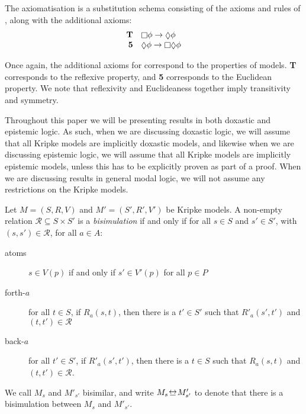 
\begin{definition}
The axiomatisation \axiomS{} is a substitution schema consisting of the axioms
and rules of \axiomK{}, along with the additional axioms:
$$
\begin{array}{rl}
{\bf T} & \knows \phi \implies \suspects \phi\\
{\bf 5} & \suspects \phi \implies \knows \suspects \phi\\
\end{array}
$$
\end{definition}

Once again, the additional axioms for \axiomS{} correspond to the properties of
\classS{} models. {\bf T} corresponds to the reflexive property, and {\bf 5}
corresponds to the Euclidean property. We note that reflexivity and Euclideaness
together imply transitivity and symmetry.

Throughout this paper we will be presenting results in both doxastic and
epistemic logic.  As such, when we are discussing doxastic logic, we will
assume that all Kripke models are implicitly doxastic models, and likewise when
we are discussing epistemic logic, we will assume that all Kripke models are
implicitly epistemic models, unless this has to be explicitly proven as part of
a proof. When we are discussing results in general modal logic, we will not
assume any restrictions on the Kripke models.

\begin{definition}[Bisimulation]
Let $M = (S, R, V)$ and $M' = (S', R', V')$ be Kripke models. A non-empty
relation $\mathcal{R} \subseteq S \times S'$ is a \textit{bisimulation} if and
only if for all $s \in S$ and $s' \in S'$, with $(s, s') \in \mathcal{R}$, for
all $a \in A$:

\begin{description}
\item[atoms] $s \in V(p)$ if and only if $s' \in V'(p)$ for all
$p \in P$

\item[forth-$a$] for all $t \in S$, if $R_a(s, t)$, then there is a
$t' \in S'$ such that $R'_a(s', t')$ and $(t,
t') \in \mathcal{R}$

\item[back-$a$] for all $t' \in S'$, if $R'_a(s',
t')$, then there is a $t \in S$ such that $R_a(s, t)$ and $(t, t')
\in \mathcal{R}$.
\end{description}

We call $M_s$ and $M'_{s'}$ bisimilar, and write $M_s \bisim M'_{s'}$ to denote
that there is a bisimulation between $M_s$ and $M'_{s'}$.
\end{definition}

